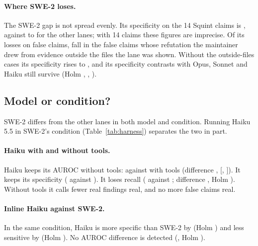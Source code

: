 \documentclass[11pt]{article}
\begin{document}
\begin{table}[h]
\centering\small

\caption{Pairwise secondary differences, family-level sign-flip, Holm-adjusted within each metric. $^\dagger$One run against three: the sign-flip is not exchangeable and the $p$ is descriptive; see the single-run comparison in the text.}
\label{tab:secondary}
\end{table}

\paragraph{Where SWE-2 loses.} The SWE-2 gap is not spread evenly. Its specificity on the 14 Squint claims is , against  to  for the other lanes; with 14 claims these figures are imprecise. Of its losses on false claims,  fall in the  false claims whose refutation the maintainer drew from evidence outside the files the lane was shown. Without the  outside-files cases its specificity rises to , and its specificity contrasts with Opus, Sonnet and Haiku still survive (Holm , , ).

\subsection{Model or condition?}

SWE-2 differs from the other lanes in both model and condition. Running Haiku 5.5 in SWE-2's condition (Table~\ref{tab:harness}) separates the two in part.

\paragraph{Haiku with and without tools.} Haiku keeps its AUROC without tools:  against  with tools (difference , [, ]). It keeps its specificity ( against ). It loses recall ( against ; difference , Holm ). Without tools it calls fewer real findings real, and no more false claims real.

\paragraph{Inline Haiku against SWE-2.} In the same condition, Haiku is more specific than SWE-2 by  (Holm ) and less sensitive by  (Holm ). No AUROC difference is detected (, Holm ).
\end{document}

